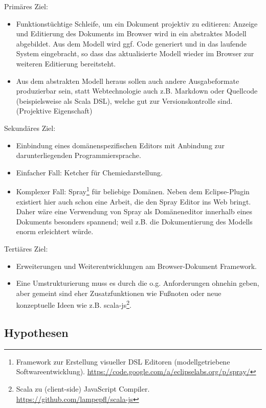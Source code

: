 \noindent Primäres Ziel:
\begin{itemize}
    \item Funktionstüchtige Schleife, um ein Dokument projektiv zu editieren: Anzeige und Editierung des Dokuments im Browser wird in ein abstraktes Modell abgebildet. Aus dem Modell wird ggf. Code generiert und in das laufende System eingebracht, so dass das aktualisierte Modell wieder im Browser zur weiteren Editierung bereitsteht.
    \item Aus dem abstrakten Modell heraus sollen auch andere Ausgabeformate produzierbar sein, statt Webtechnologie auch z.B. Markdown oder Quellcode (beispielsweise als Scala DSL), welche gut zur  Versionskontrolle sind. (Projektive Eigenschaft)
\end{itemize}

\noindent Sekundäres Ziel:
\begin{itemize}
    \item Einbindung eines domänenspezifischen Editors mit Anbindung zur darunterliegenden Programmiersprache.
    \item Einfacher Fall: Ketcher für Chemiedarstellung.
    \item Komplexer Fall: Spray\footnote{Framework zur Erstellung visueller DSL Editoren (modellgetriebene Softwareentwicklung). \url{https://code.google.com/a/eclipselabs.org/p/spray/}} für beliebige Domänen.
    Neben dem Eclipse-Plugin existiert hier auch schon eine Arbeit,
    die den Spray Editor ins Web bringt. Daher wäre eine Verwendung
    von Spray als Domäneneditor innerhalb eines Dokuments besonders spannend;
    weil z.B. die Dokumentierung des Modells enorm erleichtert würde.
\end{itemize}

\noindent Tertiäres Ziel:
\begin{itemize}
    \item Erweiterungen und Weiterentwicklungen am Browser-Dokument Framework.
    \item Eine Umstrukturierung muss es durch die o.g. Anforderungen ohnehin geben, aber gemeint sind eher Zusatzfunktionen wie Fußnoten oder neue konzeptuelle Ideen wie z.B. scala-js\footnote{Scala zu (client-side) JavaScript Compiler. \url{https://github.com/lampepfl/scala-js}}.
\end{itemize}



\subsection{Hypothesen}

